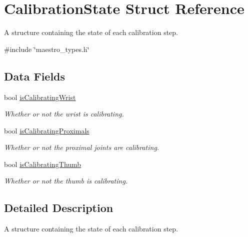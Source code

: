 \hypertarget{struct_calibration_state}{}\section{Calibration\+State Struct Reference}
\label{struct_calibration_state}


A structure containing the state of each calibration step.  




{\ttfamily \#include \char`\"{}maestro\+\_\+types.\+h\char`\"{}}

\subsection*{Data Fields}
\begin{DoxyCompactItemize}
\item 
\mbox{\label{struct_calibration_state_abd15e9831a5ba96ffdac2870b9166d6f}} 
bool \hyperlink{struct_calibration_state_abd15e9831a5ba96ffdac2870b9166d6f}{is\+Calibrating\+Wrist}
\begin{DoxyCompactList}\small\item\em Whether or not the wrist is calibrating. \end{DoxyCompactList}\item 
\mbox{\label{struct_calibration_state_af84b387233c9acd70972ec87ad94656d}} 
bool \hyperlink{struct_calibration_state_af84b387233c9acd70972ec87ad94656d}{is\+Calibrating\+Proximals}
\begin{DoxyCompactList}\small\item\em Whether or not the proximal joints are calibrating. \end{DoxyCompactList}\item 
\mbox{\label{struct_calibration_state_a2969ce52a807ddf3f3593d17272955aa}} 
bool \hyperlink{struct_calibration_state_a2969ce52a807ddf3f3593d17272955aa}{is\+Calibrating\+Thumb}
\begin{DoxyCompactList}\small\item\em Whether or not the thumb is calibrating. \end{DoxyCompactList}\end{DoxyCompactItemize}


\subsection{Detailed Description}
A structure containing the state of each calibration step. 